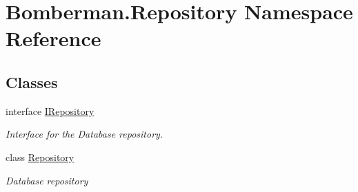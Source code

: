 \hypertarget{namespace_bomberman_1_1_repository}{}\section{Bomberman.\+Repository Namespace Reference}
\label{namespace_bomberman_1_1_repository}
\subsection*{Classes}
\begin{DoxyCompactItemize}
\item 
interface \mbox{\hyperlink{interface_bomberman_1_1_repository_1_1_i_repository}{I\+Repository}}
\begin{DoxyCompactList}\small\item\em Interface for the Database repository. \end{DoxyCompactList}\item 
class \mbox{\hyperlink{class_bomberman_1_1_repository_1_1_repository}{Repository}}
\begin{DoxyCompactList}\small\item\em Database repository \end{DoxyCompactList}\end{DoxyCompactItemize}

